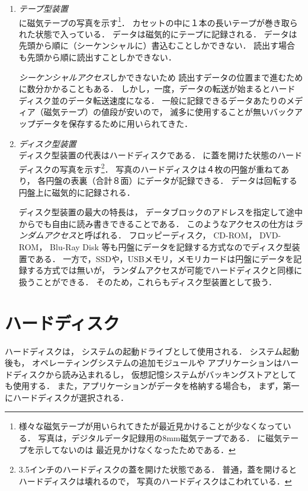 \begin{enumerate}
\item \emph{テープ型装置}\\
に磁気テープの写真を示す\footnote{
様々な磁気テープが用いられてきたが最近見かけることが少なくなっている．
写真は，デジタルデータ記録用の8mm磁気テープである．
に磁気テープを示してないのは
最近見かけなくなったためである．
}．
カセットの中に１本の長いテープが巻き取られた状態で入っている．
データは磁気的にテープに記録される．
データは先頭から順に（シーケンシャルに）書込むことしかできない．
読出す場合も先頭から順に読出すことしかできない．

\emph{シーケンシャルアクセス}しかできないため
読出すデータの位置まで進むために数分かかることもある．
しかし，一度，データの転送が始まるとハードディスク並のデータ転送速度になる．
一般に記録できるデータあたりのメディア（磁気テープ）の値段が安いので，
滅多に使用することが無いバックアップデータを保存するために用いられてきた．


\item \emph{ディスク型装置} \\
ディスク型装置の代表はハードディスクである．
に蓋を開けた状態のハードディスクの写真を示す\footnote{
3.5インチのハードディスクの蓋を開けた状態である．
普通，蓋を開けるとハードディスクは壊れるので，
写真のハードディスクはこわれている．}．
写真のハードディスクは４枚の円盤が重ねてあり，
各円盤の表裏（合計８面）にデータが記録できる．
データは回転する円盤上に磁気的に記録される．

ディスク型装置の最大の特長は，
データブロックのアドレスを指定して途中からでも自由に読み書きできることである．
このようなアクセスの仕方は\emph{ランダムアクセス}と呼ばれる．
フロッピーディスク，
CD-ROM，
DVD-ROM，
Blu-Ray Disk 等も円盤にデータを記録する方式なのでディスク型装置である．
一方で，SSDや，USBメモリ，メモリカードは円盤にデータを記録する方式では無いが，
ランダムアクセスが可能でハードディスクと同様に扱うことができる．
そのため，これらもディスク型装置として扱う．


\end{enumerate}

\section{ハードディスク}
ハードディスクは，
システムの起動ドライブとして使用される．
システム起動後も，
オペレーティングシステムの追加モジュールや
アプリケーションはハードディスクから読み込まれるし，
仮想記憶システムがバッキングストアとしても使用する．
また，アプリケーションがデータを格納する場合も，
まず，第一にハードディスクが選択される．

